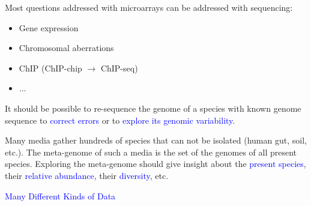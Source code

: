 \documentclass[dvips, lscape]{foils}
\newcommand{\textblue}[1]{\textcolor{blue}{#1}}
\newcommand{\emphase}[1]{\textblue{#1}}
\newcommand{\chapter}[1]{
  \addtocounter{chapter}{1}
  \setcounter{section}{0}
  \setcounter{subsection}{0}
  {\centerline{\LARGE \textblue{#1}}}
  }
\newcommand{\subsection}[1]{
  \addtocounter{subsection}{1}
  {\noindent{\large \textblue{#1}}}
  }
\newcommand{\paragraph}[1]{\noindent{\textblue{#1}}}
\begin{document}
\newpage
\subsection{Same purpose as microarrays...}

Most questions addressed with
microarrays can be addressed with sequencing:
\begin{itemize}
\item \vspace{-0.5cm} Gene expression
\item \vspace{-0.5cm} Chromosomal aberrations 
\item \vspace{-0.5cm} ChIP (ChIP-chip $\rightarrow$ ChIP-seq)
\item \vspace{-0.5cm} ...
\end{itemize}

\subsection{... Plus others} 

\paragraph{Genome re-sequencing.} It should be possible to re-sequence
the genome of a species with known genome sequence to \emphase{correct
  errors} or to \emphase{explore its genomic variability}.

\paragraph{Meta-genome.} Many media gather hundreds of species that
  can not be isolated (human gut, soil, etc.). The meta-genome of such
  a media is the set of the genomes of all present species. Exploring
  the meta-genome should give insight about the \emphase{present species},
  their \emphase{relative abundance}, their \emphase{diversity}, etc.

\newpage
\chapter{Many Different Kinds of Data} 
\end{document}

